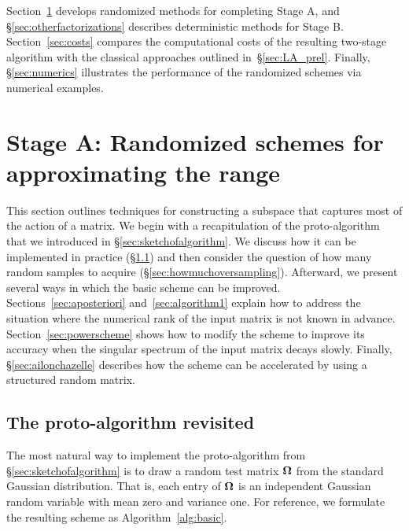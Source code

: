 \documentclass[final]{siamltex}
\newcounter{algorithm}[section]
\begin{document}
Section~\ref{sec:algorithm} develops randomized methods for completing Stage A,
and \S\ref{sec:otherfactorizations} describes deterministic methods for Stage B.
Section~\ref{sec:costs} compares the computational costs of the resulting two-stage
algorithm with the classical approaches outlined in~\S\ref{sec:LA_prel}.
Finally, \S\ref{sec:numerics} illustrates the performance of the randomized schemes
via numerical examples.


\section{Stage A: Randomized schemes for approximating the range}
\label{sec:algorithm}

This section outlines techniques for constructing a subspace that captures
most of the action of a matrix.  We begin with a recapitulation of the
proto-algorithm that we introduced in \S\ref{sec:sketchofalgorithm}.
We discuss how it can be implemented in practice (\S\ref{sec:proto_revisited})
and then consider the question of how many random samples to acquire
(\S\ref{sec:howmuchoversampling}).
Afterward, we present several ways in which the basic scheme can be improved.
Sections~\ref{sec:aposteriori} and~\ref{sec:algorithm1} explain how to address
the situation where the numerical rank of the input matrix is not known in advance.
Section~\ref{sec:powerscheme} shows how to modify the scheme to improve its
accuracy when the singular spectrum of the input matrix decays slowly.
Finally, \S\ref{sec:ailonchazelle} describes how the scheme can be accelerated
by using a structured random matrix.

\subsection{The proto-algorithm revisited}
\label{sec:proto_revisited}

The most natural way to implement the proto-algorithm from \S\ref{sec:sketchofalgorithm}
is to draw a random test matrix $\bm{\Omega}$ from the standard Gaussian distribution.
That is, each entry of $\bm{\Omega}$ is an independent Gaussian random variable with
mean zero and variance one.  For reference, we formulate the resulting scheme as
Algorithm~\ref{alg:basic}.
\end{document}
